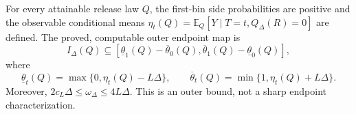 For every attainable release law \(Q\), the first-bin side probabilities are positive and the observable conditional means \(\eta_t(Q)=\mathbb E_Q[Y\mid T=t,Q_\Delta(R)=0]\) are defined.  The proved, computable outer endpoint map is
\[
 I_\Delta(Q)\subseteq
 [\underline\theta_1(Q)-\overline\theta_0(Q),
   \overline\theta_1(Q)-\underline\theta_0(Q)],
\]
where
\[
 \underline\theta_t(Q)=\max\{0,\eta_t(Q)-L\Delta\},
 \qquad
 \overline\theta_t(Q)=\min\{1,\eta_t(Q)+L\Delta\}.
\]
Moreover, \(2c_L\Delta\le\omega_\Delta\le4L\Delta\).  This is an outer bound, not a sharp endpoint characterization.